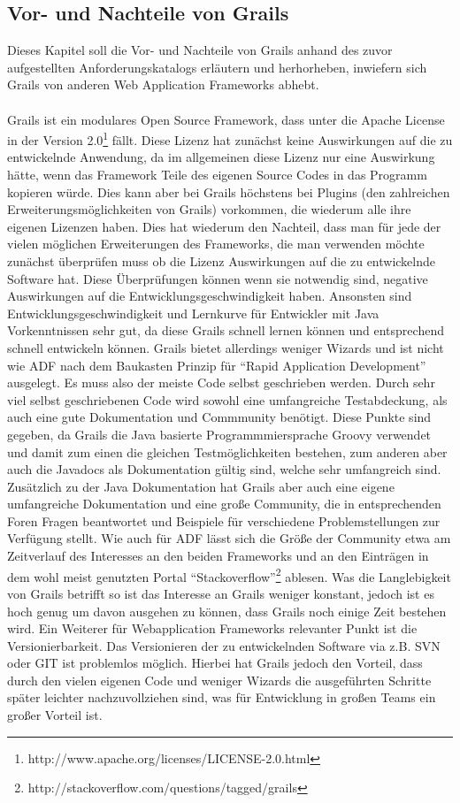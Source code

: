 \subsection{Vor- und Nachteile von Grails}
Dieses Kapitel soll die Vor- und Nachteile von Grails anhand des zuvor aufgestellten Anforderungskatalogs erläutern und herhorheben, inwiefern sich Grails von anderen Web Application Frameworks abhebt.\\\\
Grails ist ein modulares Open Source Framework, dass unter die Apache License in der Version 2.0\footnote{http://www.apache.org/licenses/LICENSE-2.0.html} fällt. Diese Lizenz hat zunächst keine Auswirkungen auf die zu entwickelnde Anwendung, da im allgemeinen diese Lizenz nur eine Auswirkung hätte, wenn das Framework Teile des eigenen Source Codes in das Programm kopieren würde. Dies kann aber bei Grails höchstens bei Plugins (den zahlreichen Erweiterungsmöglichkeiten von Grails) vorkommen, die wiederum alle ihre eigenen Lizenzen haben. Dies hat wiederum den Nachteil, dass man für jede der vielen möglichen Erweiterungen des Frameworks, die man verwenden möchte zunächst überprüfen muss ob die Lizenz Auswirkungen auf die zu entwickelnde Software hat. Diese Überprüfungen können wenn sie notwendig sind, negative Auswirkungen auf die Entwicklungsgeschwindigkeit haben. Ansonsten sind Entwicklungsgeschwindigkeit und Lernkurve für Entwickler mit Java Vorkenntnissen sehr gut, da diese Grails schnell lernen können und entsprechend schnell entwickeln können. Grails bietet allerdings weniger Wizards und ist nicht wie ADF nach dem Baukasten Prinzip für "`Rapid Application Development"' ausgelegt. Es muss also der meiste Code selbst geschrieben werden. Durch sehr viel selbst geschriebenen Code wird sowohl eine umfangreiche Testabdeckung, als auch eine gute Dokumentation und Commmunity benötigt. Diese Punkte sind gegeben, da Grails die Java basierte Programmmiersprache Groovy verwendet und damit zum einen die gleichen Testmöglichkeiten bestehen, zum anderen aber auch die Javadocs als Dokumentation gültig sind, welche sehr umfangreich sind. Zusätzlich zu der Java Dokumentation hat Grails aber auch eine eigene umfangreiche Dokumentation und eine große Community, die in entsprechenden Foren Fragen beantwortet und Beispiele für verschiedene Problemstellungen zur Verfügung stellt. Wie auch für ADF lässt sich die Größe der Community etwa am Zeitverlauf des Interesses an den beiden Frameworks und an den Einträgen in dem wohl meist genutzten Portal "`Stackoverflow"'\footnote{http://stackoverflow.com/questions/tagged/grails} ablesen. Was die Langlebigkeit von Grails betrifft so ist das Interesse an Grails weniger konstant, jedoch ist es hoch genug um davon ausgehen zu können, dass Grails noch einige Zeit bestehen wird. Ein Weiterer für Webapplication Frameworks relevanter Punkt ist die Versionierbarkeit. Das Versionieren der zu entwickelnden Software via z.B. SVN oder GIT ist problemlos möglich. Hierbei hat Grails jedoch den Vorteil, dass durch den vielen eigenen Code und weniger Wizards die ausgeführten Schritte später leichter nachzuvollziehen sind, was für Entwicklung in großen Teams ein großer Vorteil ist.